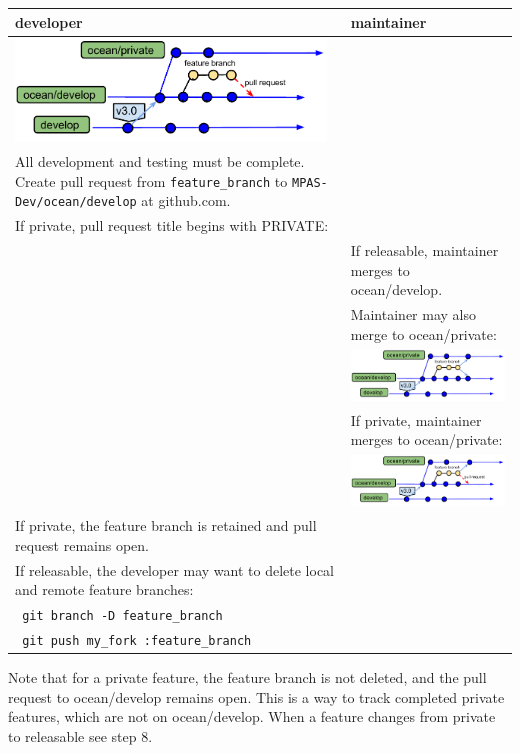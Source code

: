 \documentclass[11pt]{article}
\begin{document}
\begin{enumerate}
\begin{centering}
\end{centering}
 \begin{tabular}[c]{L{3.3in}|L{3.3in}}
developer & maintainer \\
\hline
\includegraphics[width=3.25in]{f/MPASworkflow_3a.pdf} \\
All development and testing must be complete.
Create pull request from \verb|feature_branch| to \verb|MPAS-Dev/ocean/develop| at github.com. \\
If private, pull request title begins with PRIVATE: \\
& If releasable, maintainer merges to ocean/develop.\\
& Maintainer may also merge to ocean/private: \\
& \includegraphics[width=3.25in]{f/MPASworkflow_3e.pdf} \\
& If private, maintainer merges to ocean/private:\\
& \includegraphics[width=3.25in]{f/MPASworkflow_3c.pdf} \\
If private, the feature branch is retained and pull request remains open.\\
If releasable, the developer may want to delete local and remote feature branches: \\
\verb| git branch -D feature_branch|  \\
\verb| git push my_fork :feature_branch| \\
 \end{tabular}

Note that for a private feature, the feature branch is not deleted, and the pull request to ocean/develop remains open.  This is a way to track completed private features, which are not on ocean/develop.  When a feature changes from private to releasable see step 8.




\end{enumerate}
\end{document}
